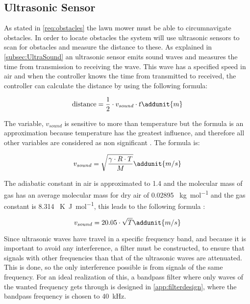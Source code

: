 \subsection{Ultrasonic Sensor}
As stated in \autoref{req:obstacles} the lawn mower must be able to circumnavigate obstacles. In order to locate obstacles the system will use ultrasonic sensors to scan for obstacles and measure the distance to these. As explained in \autoref{subsec:UltraSound} an ultrasonic sensor emits sound waves and measures the time from transmission to receiving the wave. This wave has a specified speed in air and when the controller knows the time from transmitted to received, the controller can calculate the distance by using the following formula: 

	\begin{equation}
	\text{distance} = \frac{1}{2}\cdot  v_{sound} \cdot t \addunit{m}
	\end{equation}
	
	\startexplain
	\stopexplain

The variable, $v_{sound}$ is sensitive to more than temperature but the formula is an approximation because temperature has the greatest influence, and therefore all other variables are considered as non significant \citep{SoundSpeed}. The formula is: 

	\begin{equation}
		v_{sound}=\sqrt{\frac{\gamma \cdot R \cdot T}{M}} \addunit{m/s}
	\end{equation}

	\startexplain
	\stopexplain

The adiabatic constant in air is approximated to 1.4 and the molecular mass of gas has an average molecular mass for dry air of 0.02895 \SI{}{\kilogram\per\mol} and the gas constant is 8.314 \SI{}{\kelvin\joule\per\mol}, this leads to the following formula \citep{SoundSpeed}:

	\begin{equation}
		v_{sound}= 20.05\cdot \sqrt T\addunit{m/s}
	\end{equation}

Since ultrasonic waves have travel in a specific frequency band, and because it is important to avoid any interference, a filter must be constructed, to ensure that signals with other frequencies than that of the ultrasonic waves are attenuated. This is done, so the only interference possible is from signals of the same frequency. For an ideal realization of this, a bandpass filter where only waves of the wanted frequency gets through is designed in \autoref{app:filterdesign}, where the bandpass frequency is chosen to \SI{40}{\kilo\hertz}.

